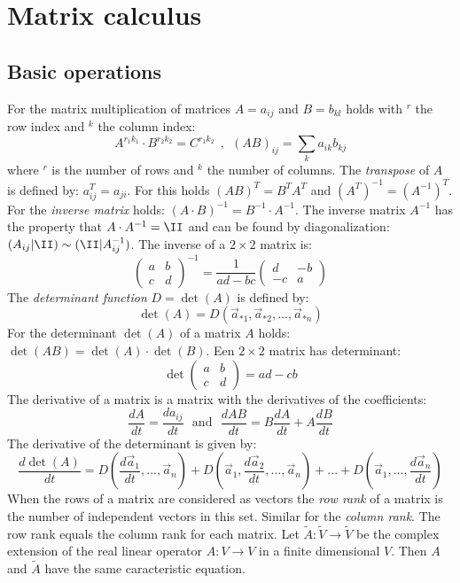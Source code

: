 \section{Matrix calculus}
\subsection{Basic operations}
For the matrix multiplication of matrices $A=a_{ij}$ and $B=b_{kl}$ holds
with $^r$ the row index and $^k$ the column index:
\[
A^{r_1k_1}\cdot B^{r_2k_2}=C^{r_1k_2}~~,~~(AB)_{ij}=\sum_ka_{ik}b_{kj}
\]
where $^r$ is the number of rows and $^k$ the number of columns.
\npar
The {\it transpose} of $A$ is defined by: $a_{ij}^T=a_{ji}$.
For this holds $(AB)^T=B^TA^T$ and $(A^T)^{-1}=(A^{-1})^T$. For the
{\it inverse matrix} holds: $(A\cdot B)^{-1}=B^{-1}\cdot A^{-1}$. The inverse
matrix $A^{-1}$ has the property that $A\cdot A^{-1}=\II$ and can be found by
diagonalization: $(A_{ij}|\II)\sim(\II|A_{ij}^{-1})$.
\npar
The inverse of a $2\times2$ matrix is:
\[
\left(\begin{array}{cc}a&b\\ c&d\end{array}\right)^{-1}=\frac{1}{ad-bc}
\left(\begin{array}{cc}d&-b\\ -c&a\end{array}\right)
\]
\npar
The {\it determinant function} $D=\det(A)$ is defined by:
\[
\det(A)=D(\vec{a}_{*1},\vec{a}_{*2},...,\vec{a}_{*n})
\]
For the determinant $\det(A)$ of a matrix $A$ holds:
$\det(AB)=\det(A)\cdot\det(B)$. Een $2\times2$ matrix has determinant:
\[
\det\left(\begin{array}{cc}a&b\\ c&d \end{array}\right)=ad-cb
\]
The derivative of a matrix is a matrix with the derivatives of the coefficients:
\[
\frac{dA}{dt}=\frac{da_{ij}}{dt}~~~\mbox{and}~~~\frac{dAB}{dt}=B\frac{dA}{dt}+A\frac{dB}{dt}
\]
The derivative of the determinant is given by:
\[
\frac{d\det(A)}{dt}=D(\frac{d\vec{a}_1}{dt},...,\vec{a}_n)+
D(\vec{a}_1,\frac{d\vec{a}_2}{dt},...,\vec{a}_n)+...+D(\vec{a}_1,...,\frac{d\vec{a}_n}{dt})
\]
When the rows of a matrix are considered as vectors the {\it row rank} of a
matrix is the number of independent vectors in this set. Similar for the
{\it column rank}. The row rank equals the column rank for each matrix.
\npar
Let $\tilde{A}:\tilde{V}\rightarrow\tilde{V}$ be the complex extension of the
real linear operator $A:V\rightarrow V$ in a finite dimensional $V$.
Then $A$ and $\tilde{A}$ have the same caracteristic equation.
